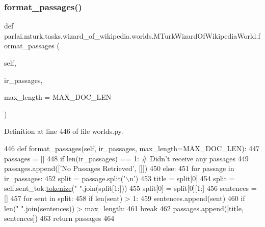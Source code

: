 \subsubsection{\texorpdfstring{format\+\_\+passages()}{format\_passages()}}
{\footnotesize\ttfamily def parlai.\+mturk.\+tasks.\+wizard\+\_\+of\+\_\+wikipedia.\+worlds.\+M\+Turk\+Wizard\+Of\+Wikipedia\+World.\+format\+\_\+passages (\begin{DoxyParamCaption}\item[{}]{self,  }\item[{}]{ir\+\_\+passages,  }\item[{}]{max\+\_\+length = {\ttfamily MAX\+\_\+DOC\+\_\+LEN} }\end{DoxyParamCaption})}



Definition at line 446 of file worlds.\+py.


\begin{DoxyCode}
446     \textcolor{keyword}{def }format\_passages(self, ir\_passages, max\_length=MAX\_DOC\_LEN):
447         passages = []
448         \textcolor{keywordflow}{if} len(ir\_passages) == 1:  \textcolor{comment}{# Didn't receive any passages}
449             passages.append([\textcolor{stringliteral}{'No Passages Retrieved'}, []])
450         \textcolor{keywordflow}{else}:
451             \textcolor{keywordflow}{for} passage \textcolor{keywordflow}{in} ir\_passages:
452                 split = passage.split(\textcolor{stringliteral}{'\(\backslash\)n'})
453                 title = split[0]
454                 split = self.sent\_tok.\hyperlink{namespaceparlai_1_1agents_1_1tfidf__retriever_1_1build__tfidf_a1fdb457e98eb4e4c26047e229686a616}{tokenize}(\textcolor{stringliteral}{" "}.join(split[1:]))
455                 split[0] = split[0][1:]
456                 sentences = []
457                 \textcolor{keywordflow}{for} sent \textcolor{keywordflow}{in} split:
458                     \textcolor{keywordflow}{if} len(sent) > 1:
459                         sentences.append(sent)
460                         \textcolor{keywordflow}{if} len(\textcolor{stringliteral}{" "}.join(sentences)) > max\_length:
461                             \textcolor{keywordflow}{break}
462                 passages.append([title, sentences])
463         \textcolor{keywordflow}{return} passages
464 
\end{DoxyCode}
\mbox{\label{classparlai_1_1mturk_1_1tasks_1_1wizard__of__wikipedia_1_1worlds_1_1MTurkWizardOfWikipediaWorld_a81fac69dc89399e21b1ad9847b62adea}} 
